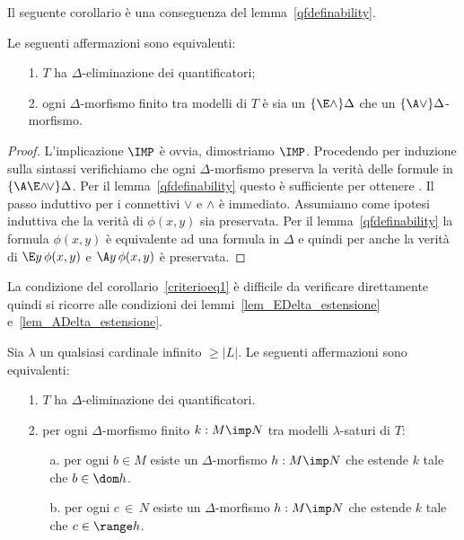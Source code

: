 Il seguente corollario \`e una conseguenza del lemma~\ref{qfdefinability}.

\begin{corollary}\label{criterioeq1}
Le seguenti affermazioni sono equivalenti:
\begin{itemize}
\item[1.] $T$ ha $\Delta$-eliminazione dei quantificatori;
\item[2.] ogni $\Delta$-morfismo finito tra modelli di $T$ \`e sia un $\{\E\wedge\}\Delta$ che un  $\{\A\vee\}\Delta$-morfismo.
\end{itemize}
\end{corollary}
\begin{proof}
L'implicazione $\IMP$ \`e ovvia, dimostriamo $\IMP$. Procedendo per induzione sulla sintassi verifichiamo che ogni $\Delta$-morfismo preserva la verit\`a delle formule in $\{\A\E\mathord\wedge\!\mathord\vee\}\Delta$. Per il lemma~\ref{qfdefinability} questo \`e sufficiente per ottenere . Il passo induttivo per i connettivi $\vee$ e $\wedge$ \`e immediato.  Assumiamo come ipotesi induttiva che la verit\`a di $\phi(x,y)$ sia preservata.  Per il  lemma~\ref{qfdefinability} la formula $\phi(x,y)$ \`e equivalente ad una formula in $\Delta$ e quindi per  anche la verit\`a di $\E y\, \phi (x,y)$ e $\A y \,\phi (x,y)$ \`e preservata.
\end{proof}

La condizione  del corollario~\ref{criterioeq1} \`e difficile da verificare direttamente quindi si ricorre alle condizioni  dei lemmi~\ref{lem_EDelta_estensione} e~\ref{lem_ADelta_estensione}.

\begin{corollary}\label{criterioeq2}
Sia $\lambda$ un qualsiasi cardinale infinito $\ge|L|$. Le seguenti affermazioni sono equivalenti:
\begin{itemize}
\item[1.] $T$ ha $\Delta$-eliminazione dei quantificatori.
\item[2.] per ogni $\Delta$-morfismo finito $k:M\imp N$ tra modelli $\lambda$-saturi di $T$:
\begin{itemize}                                                                                               \item[a.] per ogni $b\in M$ esiste un $\Delta$-morfismo $h:M\imp N$ che estende $k$ tale che $b\in\dom h$.                                                                                \item[b.]per ogni $c\,\in\,N$ esiste un $\Delta$-morfismo $h:M\imp N$ che estende $k$ tale che $c\in\range h$.\QED                                                                                          \end{itemize}
\end{itemize}
\end{corollary}

